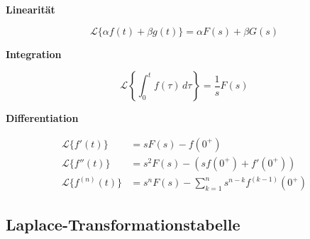 \documentclass[a4paper,11pt,oneside,open=any,parskip=half, DIV=15]{scrreprt}
\begin{document}
      \textbf{Linearität}
         \begin{importantbox}
            \[
               \mathcal{L}\{\alpha f(t) + \beta g(t)\} = \alpha F(s) + \beta G(s)
            \]
         \end{importantbox}

      \textbf{Integration}
         \begin{importantbox}
            \[
               \mathcal{L}\left\{\int_{0}^{t} f(\tau)\,d\tau\right\} = \frac{1}{s} F(s)
            \]
         \end{importantbox}

      \textbf{Differentiation}
         \begin{importantbox}
            \begin{align*}
               \mathcal{L}\{f'(t)\} &= sF(s) - f(0^+) \\
               \mathcal{L}\{f''(t)\} &= s^2F(s) - (sf(0^+) + f'(0^+)) \\
               \mathcal{L}\{f^{(n)}(t)\} &= s^nF(s) - \sum_{k=1}^{n} s^{n-k} f^{(k-1)}(0^+)  %
            \end{align*}
         \end{importantbox}

   \subsection*{Laplace-Transformationstabelle}
\end{document}
